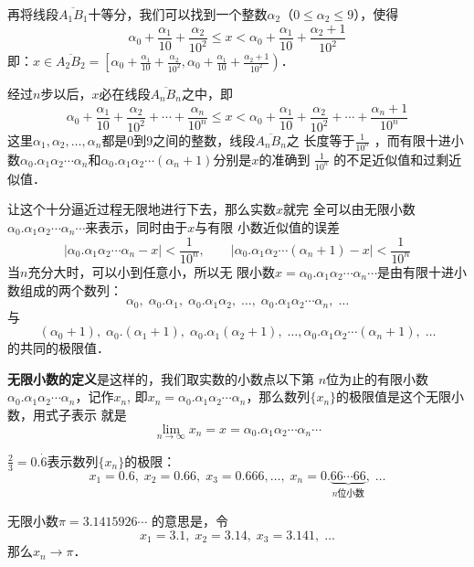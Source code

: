 再将线段$\overline{A_1B_1}$十等分，我们可以找到一个整数$\alpha_2$（$0\le \alpha_2\le 9$），使得
\[\alpha_0+\frac{\alpha_1}{10}+\frac{\alpha_2}{10^2}\le x<\alpha_0+\frac{\alpha_1}{10}+\frac{\alpha_2+1}{10^2}\]
即：$x\in\overline{A_2B_2}=\left[\alpha_0+\frac{\alpha_1}{10}+\frac{\alpha_2}{10^2}, \alpha_0+\frac{\alpha_1}{10}+\frac{\alpha_2+1}{10^2}\right)$．

经过$n$步以后，$x$必在线段$\overline{A_nB_n}$之中，即
\[\alpha_0+\frac{\alpha_1}{10}+\frac{\alpha_2}{10^2}+\cdots+\frac{\alpha_n}{10^n}\le x<\alpha_0+\frac{\alpha_1}{10}+\frac{\alpha_2}{10^2}+\cdots+\frac{\alpha_n+1}{10^n}\]
这里$\alpha_1,\alpha_2,\ldots,\alpha_n$都是0到9之间的整数，线段$\overline{A_nB_n}$之
长度等于$\frac{1}{10^n}$
，而有限十进小数$\alpha_0.\alpha_1\alpha_2\cdots\alpha_n$和$\alpha_0.\alpha_1\alpha_2\cdots(\alpha_n+1)$分别是$x$的准确到
$\frac{1}{10^n}$
的不足近似值和过剩近似值．

让这个十分逼近过程无限地进行下去，那么实数$x$就完
全可以由无限小数$\alpha_0.\alpha_1\alpha_2\cdots\alpha_n\cdots$来表示，同时由于$x$与有限
小数近似值的误差
\[|\alpha_0.\alpha_1\alpha_2\cdots\alpha_n-x|<\frac{1}{10^n},\qquad  |\alpha_0.\alpha_1\alpha_2\cdots(\alpha_n+1)-x|<\frac{1}{10^n}\]
当$n$充分大时，可以小到任意小，所以无
限小数$x=\alpha_0.\alpha_1\alpha_2\cdots\alpha_n\cdots$是由有限十进小数组成的两个数列：
\[\alpha_0,\; \alpha_0.\alpha_1,\;\alpha_0.\alpha_1\alpha_2,\;\ldots,\;  \alpha_0.\alpha_1\alpha_2\cdots\alpha_n,\;\ldots\]
与
\[(\alpha_0+1),\; \alpha_0.(\alpha_1+1),\;\alpha_0.\alpha_1(\alpha_2+1),\;\ldots, \alpha_0.\alpha_1\alpha_2\cdots(\alpha_n+1),\;\ldots\]
的共同的极限值．

\textbf{无限小数的定义}是这样的，我们取实数的小数点以下第
$n$位为止的有限小数$\alpha_0.\alpha_1\alpha_2\cdots\alpha_n$，记作$x_n$, 即$x_n=\alpha_0.\alpha_1\alpha_2\cdots\alpha_n$，那么数列$\{x_n\}$的极限值是这个无限小数，用式子表示
就是
\[\lim_{n\to\infty}x_n=x=\alpha_0.\alpha_1\alpha_2\cdots\alpha_n\cdots\]


\begin{example}
$\frac{2}{3}=0.\dot{6}$表示数列$\{x_n\}$的极限：
\[x_1=0.6,\; x_2=0.66,\; x_3=0.666,\ldots,\; x_n=0.\underbrace{66\cdots 66}_{\text{$n$位小数}},\; \ldots\]
\end{example}

\begin{example}
    无限小数$\pi=3.1415926\cdots$
    的意思是，令
   \[ x_1=3.1,\; x_2=3.14,\; x_3=3.141,\; \ldots\]
    那么$x_n\to \pi$．
\end{example}

